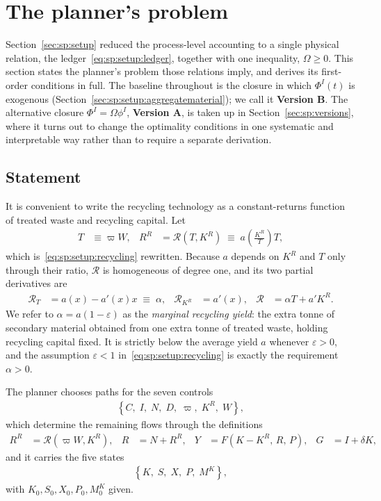 ﻿\section{The planner's problem}\label{sec:sp:problem}

Section~\ref{sec:sp:setup} reduced the process-level accounting to a single physical relation, the
ledger~\eqref{eq:sp:setup:ledger}, together with one inequality, $\Omega\ge0$. This section states
the planner's problem those relations imply, and derives its first-order conditions in full. The
baseline throughout is the closure in which $\Phi^I(t)$ is exogenous
(Section~\ref{sec:sp:setup:aggregatematerial}); we call it \textbf{Version B}. The alternative
closure $\Phi^I=\Omega\phi^I$, \textbf{Version A}, is taken up in Section~\ref{sec:sp:versions},
where it turns out to change the optimality conditions in one systematic and interpretable way
rather than to require a separate derivation.


\subsection{Statement}\label{sec:sp:problem:statement}

 It is convenient to write the recycling technology as a constant-returns
function of treated waste and recycling capital. Let
\begin{align}
T &\equiv \varpi W,
&
R^R &= \mathcal R\left(T,K^R\right)\;\equiv\;a\!\left(\frac{K^R}{T}\right)T,
\label{eq:sp:problem:recycling-crs}
\end{align}
which is~\eqref{eq:sp:setup:recycling} rewritten. Because $a$ depends on $K^R$ and $T$ only through
their ratio, $\mathcal R$ is homogeneous of degree one, and its two partial derivatives are
\begin{align}
\mathcal R_T &= a\left(x\right)-a'\!\left(x\right)x \;\equiv\;\alpha,
&
\mathcal R_{K^R} &= a'\!\left(x\right),
&
\mathcal R &= \alpha T+a'K^R .
\label{eq:sp:problem:recycling-derivatives}
\end{align}
We refer to $\alpha=a\left(1-\varepsilon\right)$ as the \emph{marginal recycling yield}: the extra
tonne of secondary material obtained from one extra tonne of treated waste, holding recycling
capital fixed. It is strictly below the average yield $a$ whenever $\varepsilon>0$, and the
assumption $\varepsilon<1$ in~\eqref{eq:sp:setup:recycling} is exactly the requirement
$\alpha>0$.

The planner chooses paths for the seven controls
\begin{align}
\left\{C,\;I,\;N,\;D,\;\varpi,\;K^R,\;W\right\},
\label{eq:sp:problem:controls}
\end{align}
which determine the remaining flows through the definitions
\begin{align}
R^R &= \mathcal R\left(\varpi W,K^R\right),
&
R &= N+R^R,
&
Y &= F\left(K-K^R,\,R,\,P\right),
&
G &= I+\delta K,
\label{eq:sp:problem:definitions}
\end{align}
and it carries the five states
\begin{align}
\left\{K,\;S,\;X,\;P,\;M^K\right\},
\label{eq:sp:problem:states}
\end{align}
with $K_0,S_0,X_0,P_0,M^K_0$ given.

